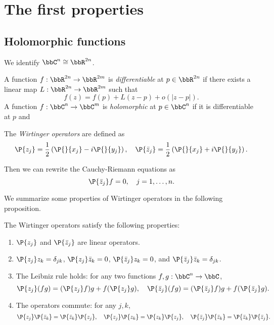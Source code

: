 \section{The first properties}


\subsection{Holomorphic functions}

    We identify \(\bbC^n \cong \bbR^{2n}\).

    \begin{definition}\label{def:differentiable_and_holomorphic_function}
        A function \(f: \bbR^{2n} \to \bbR^{2m}\) is \emph{differentiable} at \(p \in \bbR^{2n}\) if there exists a linear map \(L: \bbR^{2n} \to \bbR^{2m}\) such that 
        \[ f(z) = f(p) + L(z - p) + o(|z - p|). \]
        A function \(f: \bbC^n \to \bbC^m\) is \emph{holomorphic} at \(p \in \bbC^n\) if it is differentiable at \(p\) and 
    \end{definition}

    \begin{definition}\label{def:Wirtinger_operators}
        The \emph{Wirtinger operators} are defined as 
        \[ \P{z_j} = \frac{1}{2}\left( \P{}{x_j} - i\P{}{y_j} \right), \quad \P{\bar{z}_j} = \frac{1}{2}\left( \P{}{x_j} + i\P{}{y_j} \right). \]
    \end{definition}

    Then we can rewrite the Cauchy-Riemann equations as
    \[ \P{\bar{z}_j} f = 0, \quad j = 1, \ldots, n. \]

    We summarize some properties of Wirtinger operators in the following proposition.
    \begin{proposition}\label{prop:properties_of_Wirtinger_operators}
        The Wirtinger operators satisfy the following properties:
        \begin{enumerate}
            \item \(\P{z_j}\) and \(\P{\bar{z}_j}\) are linear operators.
            \item \(\P{z_j} z_k = \delta_{jk}\), \(\P{z_j} \bar{z}_k = 0\), \(\P{\bar{z}_j} z_k = 0\), and \(\P{\bar{z}_j} \bar{z}_k = \delta_{jk}\).
            \item The Leibniz rule holds: for any two functions \(f, g: \bbC^n \to \bbC\),
            \[ \P{z_j}(fg) = (\P{z_j} f)g + f(\P{z_j} g), \quad \P{\bar{z}_j}(fg) = (\P{\bar{z}_j} f)g + f(\P{\bar{z}_j} g). \]
            \item The operators commute: for any \(j, k\),
            \[ \P{z_j}\P{\bar{z}_k} = \P{\bar{z}_k}\P{z_j}, \quad \P{z_j}\P{z_k} = \P{z_k}\P{z_j}, \quad \P{\bar{z}_j}\P{\bar{z}_k} = \P{\bar{z}_k}\P{\bar{z}_j}. \]
        \end{enumerate}
    \end{proposition}

